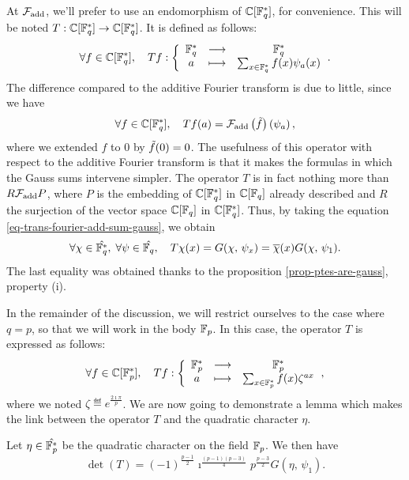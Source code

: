  
At $ \mathcal{F}_{\text{add}} $, we'll prefer to use an endomorphism of $ \mathbb{C} [\mathbb{F}_q^*] $, for convenience. This will be noted $ T: \mathbb{C} [\mathbb{F}_q^*] \rightarrow \mathbb{C} [\mathbb{F}_q^*] $. It is defined as follows:
\begin{equation*}
\forall f \in \mathbb{C} [\mathbb{F}_q^*], \quad T f: {\left\{ \begin{array}{ccc} \mathbb{F}_q^* & \longrightarrow & \mathbb{F}_q^* \\ a & \longmapsto & \sum_{x \in \mathbb{F}_q^*}^{}f(x) \psi_a (x) \end{array} \right.}.
\end{equation*}
The difference compared to the additive Fourier transform is due to little, since we have
\begin{equation*}
\forall f \in \mathbb{C} [\mathbb{F}_q^*], \quad T f(a) = \mathcal{F}_{\text{add}} \left(\tilde{f} \right) \left(\psi_a \right) ,
\end{equation*}
where we extended $ f $ to 0 by $ \tilde{f} (0) = 0 $. The usefulness of this operator with respect to the additive Fourier transform is that it makes the formulas in which the Gauss sums intervene simpler. The operator $ T $ is in fact nothing more than $ R \mathcal{F}_{\text{add}} P $, where $ P $ is the embedding of $ \mathbb{C} [\mathbb{F}_q^*] $ in $ \mathbb{C} [\mathbb{F}_q] $ already described and $ R $ the surjection of the vector space $ \mathbb{C} [\mathbb{F}_q] $ in $ \mathbb{C} [\mathbb{F}_q^*] $. Thus, by taking the equation \eqref{eq-trans-fourier-add-sum-gauss}, we obtain
\begin{equation}
\label{eq-expression-operator-t-char-mult}
\forall \chi \in \hat{\mathbb{F}_q^*}, \; \forall \psi \in \hat{\mathbb{F}_q}, \quad T \chi (x) = G (\chi, \, \psi_x) = \overline{\chi} (x) G (\chi, \, \psi_1).
\end{equation}
The last equality was obtained thanks to the proposition \ref{prop-ptes-are-gauss}, property (i).
 
In the remainder of the discussion, we will restrict ourselves to the case where $ q = p $, so that we will work in the body $ \mathbb{F}_p $. In this case, the operator $ T $ is expressed as follows:
\begin{equation*}
\forall f \in \mathbb{C} [\mathbb{F}_p^*], \quad T f: {\left\{ \begin{array}{ccc} \mathbb{F}_p^* & \longrightarrow & \mathbb{F}_p^* \\ a & \longmapsto & \sum_{x \in \mathbb{F}_p^*}^{}f(x) \zeta^{ax} \end{array} \right.},
\end{equation*}
where we noted $ \zeta \eqdef e^{\frac{2 \imath \pi}{p}} $. We are now going to demonstrate a lemma which makes the link between the operator $ T $ and the quadratic character $ \eta $.
 
\begin{lem}
\label{lem-calcul-det-T}
Let $ \eta \in \hat{\mathbb{F}_p^*} $ be the quadratic character on the field $ \mathbb{F}_p $. We then have
\begin{equation*}
\det (T) = (-1)^{\frac{p-1}{2}} \imath^{\frac{(p-1) (p-3)}{4}} p^{\frac{p-3}{2}} G (\eta, \, \psi_1).
\end{equation*}
\end{lem}
 
